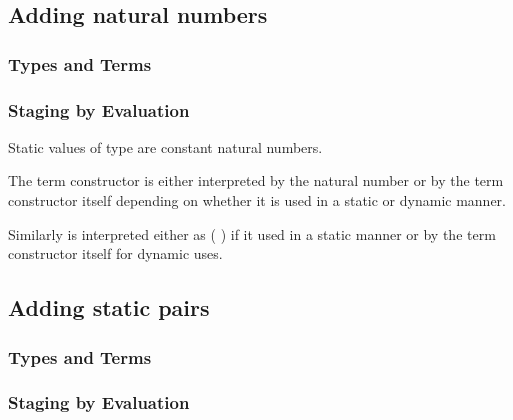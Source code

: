 \documentclass{article}
\begin{document}
\subsection{Adding natural numbers}

\subsubsection{Types and Terms}





\subsubsection{Staging by Evaluation}

Static values of type  are constant natural numbers.


The term constructor  is either interpreted by
the natural number  or by the term constructor itself
depending on whether it is used in a static or dynamic manner.


Similarly  is interpreted either as ( \AF{+}\AS{\_})
if it used in a static manner or by the term constructor itself
for dynamic uses.



\subsection{Adding static pairs}\label{sec:stagingmodelprod}

\subsubsection{Types and Terms}




\subsubsection{Staging by Evaluation}
\end{document}
